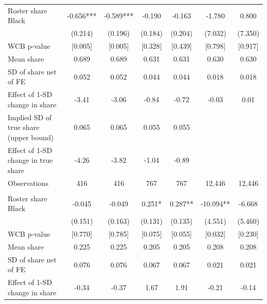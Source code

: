 \begin{table}[!h]
{\begin{threeparttable}
\begin{tabular}[t]{lcccccc}
\hspace{1em}Roster share Black & -0.656*** & -0.589*** & -0.190 & -0.163 & -1.780 & 0.800\\
\hspace{1em} & (0.214) & (0.196) & (0.184) & (0.204) & (7.032) & (7.350)\\
\hspace{1em}WCB p-value & {}[0.005] & {}[0.005] & {}[0.328] & {}[0.439] & {}[0.798] & {}[0.917]\\
\hspace{1em}Mean share & 0.689 & 0.689 & 0.631 & 0.631 & 0.630 & 0.630\\
\hspace{1em}SD of share net of FE & 0.052 & 0.052 & 0.044 & 0.044 & 0.018 & 0.018\\
\hspace{1em}Effect of 1-SD change in share & -3.41 & -3.06 & -0.84 & -0.72 & -0.03 & 0.01\\
\hspace{1em}Implied SD of true share (upper bound) & 0.065 & 0.065 & 0.055 & 0.055 &  & \\
\hspace{1em}Effect of 1-SD change in true share & -4.26 & -3.82 & -1.04 & -0.89 &  & \\
\hspace{1em}Observations & 416 & 416 & 767 & 767 & 12,446 & \vphantom{4} 12,446\\
\addlinespace[0.3em]
\multicolumn{7}{l}{\textbf{Panel C: Provisional (Wikipedia category flag)}}\\
\hspace{1em}Roster share Black & -0.045 & -0.049 & 0.251* & 0.287** & -10.094** & -6.668\\
\hspace{1em} & (0.151) & (0.163) & (0.131) & (0.135) & (4.551) & (5.460)\\
\hspace{1em}WCB p-value & {}[0.770] & {}[0.785] & {}[0.075] & {}[0.055] & {}[0.032] & {}[0.230]\\
\hspace{1em}Mean share & 0.225 & 0.225 & 0.205 & 0.205 & 0.208 & 0.208\\
\hspace{1em}SD of share net of FE & 0.076 & 0.076 & 0.067 & 0.067 & 0.021 & 0.021\\
\hspace{1em}Effect of 1-SD change in share & -0.34 & -0.37 & 1.67 & 1.91 & -0.21 & -0.14\\

\end{tabular}
\end{threeparttable}}
\end{table}
